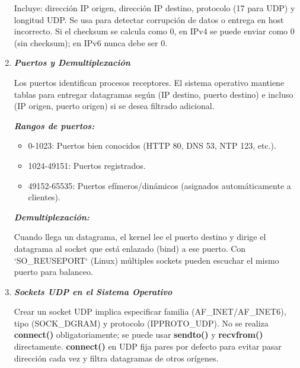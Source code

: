 \documentclass[12pt]{amsart}
\begin{document}
\begin{enumerate}
		Incluye: dirección IP origen, dirección IP destino, protocolo (17 para UDP) y longitud UDP. Se usa para detectar corrupción de datos o entrega en host incorrecto. Si el checksum se calcula como 0, en IPv4 se puede enviar como 0 (sin checksum); en IPv6 nunca debe ser 0.
		
		\bigskip\bigskip

		\item \textbf{\textit{Puertos y Demultiplexación}}
		
		\medskip
		Los puertos identifican procesos receptores. El sistema operativo mantiene tablas para entregar datagramas según (IP destino, puerto destino) e incluso (IP origen, puerto origen) si se desea filtrado adicional.
		
		\medskip \medskip	

		\noindent \textbf{\textit{Rangos de puertos:}}
		
		\medskip \medskip		

		\begin{itemize}
		\item 0-1023: Puertos bien conocidos (HTTP 80, DNS 53, NTP 123, etc.).
		\item 1024-49151: Puertos registrados.
		\item 49152-65535: Puertos efímeros/dinámicos (asignados automáticamente a clientes).
		\end{itemize}
		
		\medskip \medskip

		\noindent \textbf{\textit{Demultiplexación:}} 

		\medskip \medskip

		Cuando llega un datagrama, el kernel lee el puerto destino y dirige el datagrama al socket que está enlazado (bind) a ese puerto. Con `SO\_REUSEPORT` (Linux) múltiples sockets pueden escuchar el mismo puerto para balanceo.
		
		\bigskip\bigskip

		\item \textbf{\textit{Sockets UDP en el Sistema Operativo}}
		
		\medskip
		Crear un socket UDP implica especificar familia (AF\_INET/AF\_INET6), tipo (SOCK\_DGRAM) y protocolo (IPPROTO\_UDP). No se realiza \textbf{connect()} obligatoriamente; se puede usar \textbf{sendto()} y \textbf{recvfrom()} directamente. \textbf{connect()} en UDP fija pares por defecto para evitar pasar dirección cada vez y filtra datagramas de otros orígenes.
		

\end{enumerate}
\end{document}
